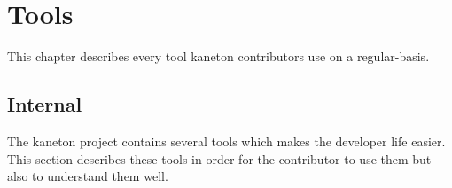 %
%
%
%
%
%

%
%

\chapter{Tools}
\label{chapter:tools}

This chapter describes every tool kaneton contributors use on a regular-basis.

\newpage

%
%

%
%

\section{Internal}

The kaneton project contains several tools which makes the developer life
easier. This section describes these tools in order for the contributor to
use them but also to understand them well.




























%
%

